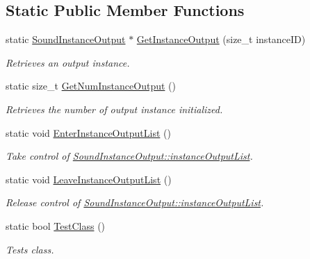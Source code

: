\subsection*{Static Public Member Functions}
\begin{DoxyCompactItemize}
\item 
static \hyperlink{class_sound_instance_output}{SoundInstanceOutput} $\ast$ \hyperlink{class_sound_instance_output_ac2bb9217f9e53a6a6cb44db494be9b20}{GetInstanceOutput} (size\_\-t instanceID)
\begin{DoxyCompactList}\small\item\em Retrieves an output instance. \item\end{DoxyCompactList}\item 
static size\_\-t \hyperlink{class_sound_instance_output_a131d7aa967c299fe1ec72803b846ff71}{GetNumInstanceOutput} ()
\begin{DoxyCompactList}\small\item\em Retrieves the number of output instance initialized. \item\end{DoxyCompactList}\item 
\hypertarget{class_sound_instance_output_a2f2417585c5877d49a3483db773b5d8d}{
static void \hyperlink{class_sound_instance_output_a2f2417585c5877d49a3483db773b5d8d}{EnterInstanceOutputList} ()}
\label{class_sound_instance_output_a2f2417585c5877d49a3483db773b5d8d}

\begin{DoxyCompactList}\small\item\em Take control of \hyperlink{class_sound_instance_output_a6c22559d4c8c6f04ee92cf6763a8493f}{SoundInstanceOutput::instanceOutputList}. \item\end{DoxyCompactList}\item 
\hypertarget{class_sound_instance_output_a05e8c0dc8a6df890a35311d3bee471ee}{
static void \hyperlink{class_sound_instance_output_a05e8c0dc8a6df890a35311d3bee471ee}{LeaveInstanceOutputList} ()}
\label{class_sound_instance_output_a05e8c0dc8a6df890a35311d3bee471ee}

\begin{DoxyCompactList}\small\item\em Release control of \hyperlink{class_sound_instance_output_a6c22559d4c8c6f04ee92cf6763a8493f}{SoundInstanceOutput::instanceOutputList}. \item\end{DoxyCompactList}\item 
static bool \hyperlink{class_sound_instance_output_a52a29fc54172750e89d6d4e2f30075fb}{TestClass} ()
\begin{DoxyCompactList}\small\item\em Tests class. \item\end{DoxyCompactList}\end{DoxyCompactItemize}
